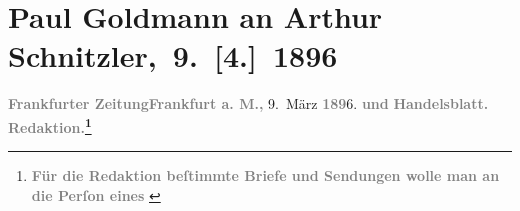 

         
         \renewcommand{\erwaehntePersonen}{Personen: Lou Andreas-Salomé,  Angelus Silesius, Richard Beer-Hofmann, Gustav Davis, Stefan George, Paul Goldmann, Hugo von Hofmannsthal, Rudolf Lothar, Johanna Mamroth, Fedor Mamroth, Felix Salten}
         \renewcommand{\erwaehnteInstitutionen}{Institutionen: Burgtheater, Frankfurter Zeitung}
         \renewcommand{\erwaehnteOrte}{Orte: Dänemark, Frankfurt am Main, Niddastraße, Niederlande, Paris, Wien}
         \renewcommand{\erwaehnteWerke}{Werke: Anatol, Cherubinischer Wandersmann, Die Zeit. Wiener Wochenschrift, Freiwild. Schauspiel in 3 Akten, Gedichte von Stefan George, Geistreiche Sinn- und Schlussreime, Ruth. Erzählung}
               \section[ Paul Goldmann an Arthur Schnitzler, 9. {[}4.{]} 1896]{ Paul Goldmann an Arthur Schnitzler, 9. {[}4.{]} 1896}\nopagebreak{}\rehead{ }\begin{ledgroupsized}[t]{13cm}\normalsize\beginnumbering \toendnotes[C]{\smallbreak\pagebreak[2]} 
\toendnotes[C]{\smallbreak}\pstart
           \noindent{}{\pb}\textcolor{gray}{\textbf{\textbf{Frankfurter Zeitung}}}\hfill \textcolor{gray}{\textbf{Frankfurt a. M., }}9. März \textcolor{gray}{\textbf{189}}6.\pend
           \pstart
           \textcolor{gray}{\textbf{und}}\pend
           \pstart
           \textcolor{gray}{\textbf{Handelsblatt.}}\pend
           \pstart
           \textcolor{gray}{\textbf{\textbf{Redaktion.\footnote{\noindent{}\textcolor{gray}{\textbf{Für die Redaktion beſtimmte Briefe und Sendungen
                                 wolle man  an die Perſon eines
}}}}}}
\end{ledgroupsized}
